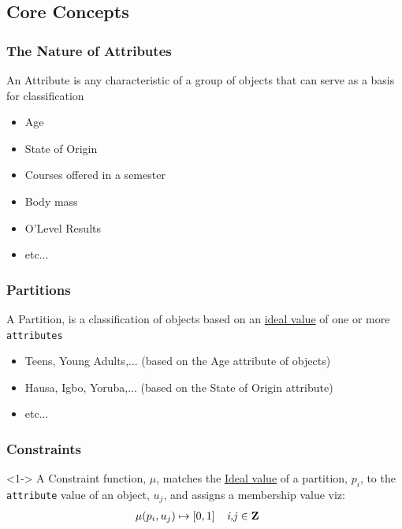 \documentclass[10pt]{beamer}
\begin{document}
		\subsection{Core Concepts}
			\begin{frame}
				\frametitle{The Nature of Attributes}
				\begin{definition}
					An Attribute is any characteristic of a group of objects that can serve as a basis for classification
				\end{definition}
				\begin{example}
					\begin{itemize}
						\item Age
						\item State of Origin
						\item Courses offered in a semester
						\item Body mass
						\item O'Level Results
						\item etc...
					\end{itemize}
				\end{example}
			\end{frame}
			\begin{frame}
				\frametitle{Partitions}
				\begin{definition}
					A Partition, is a classification of objects based on an \underline{ideal value} of one or more \texttt{attributes}
				\end{definition}
				\begin{example}
					\begin{itemize}
						\item Teens, Young Adults,... (based on the Age attribute of objects)
						\item Hausa, Igbo, Yoruba,... (based on the State of Origin attribute)
						\item etc...
					\end{itemize}
				\end{example}
			\end{frame}
			\begin{frame}
				\frametitle{Constraints}
				\vfill
				\begin{definition}<1->
					A Constraint function, $\mu$, matches the \underline{Ideal value} of a partition, $p_i$, to the \texttt{attribute} value of an object, $u_j$, and assigns a membership value viz:
					\begin{align}
						\mu(p_i,u_j) &\mapsto [0,1] \textit{\ \ \  i,j $\in \mathbf{Z}$ }\notag
					\end{align}

				\end{definition}
				\vfill
			\end{frame}
\end{document}
